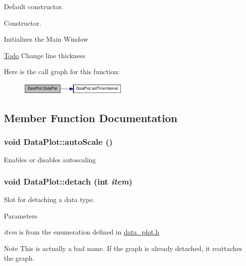 Default constructor. 

Constructor.

Initializes the Main Window 

\begin{Desc}
\item[\hyperlink{todo__todo000001}{Todo}]Change line thickness \end{Desc}




Here is the call graph for this function:\nopagebreak
\begin{figure}[H]
\begin{center}
\leavevmode
\includegraphics[width=154pt]{classDataPlot_a1343acbd6095212532c4315d6e9f1711_cgraph}
\end{center}
\end{figure}




\subsection{Member Function Documentation}
\hypertarget{classDataPlot_a6409fa9685624b4a453529254e6d943f}{
\subsubsection[{autoScale}]{\setlength{\rightskip}{0pt plus 5cm}void DataPlot::autoScale ()}}
\label{classDataPlot_a6409fa9685624b4a453529254e6d943f}
Enables or disables autoscaling \hypertarget{classDataPlot_a5521e1760646dbcf90df949e20523803}{
\subsubsection[{detach}]{\setlength{\rightskip}{0pt plus 5cm}void DataPlot::detach (int {\em item})}}
\label{classDataPlot_a5521e1760646dbcf90df949e20523803}
Slot for detaching a data type. 
\begin{DoxyParams}{Parameters}
\item[{\em item}]is from the enumeration defined in \hyperlink{data__plot_8h}{data\_\-plot.h} \end{DoxyParams}
\begin{DoxyNote}{Note}
This is actually a bad name. If the graph is already detached, it reattaches the graph. 
\end{DoxyNote}



